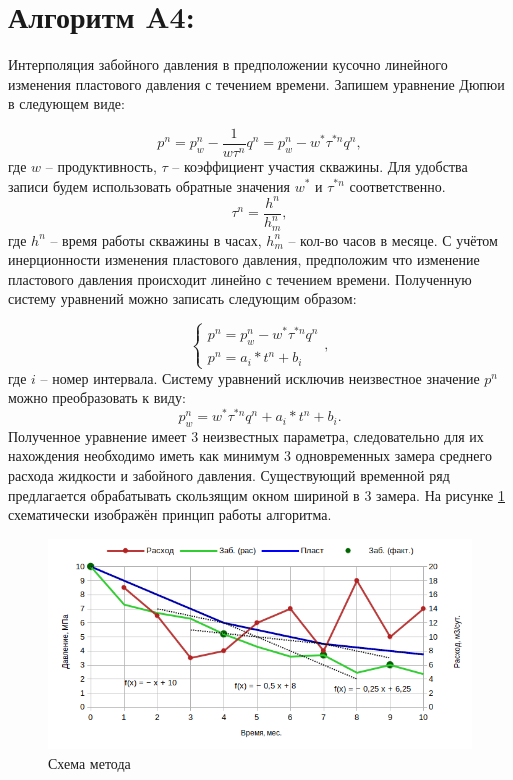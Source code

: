 \documentclass[14pt]{article}
\begin{document}
\section{Алгоритм A4:}
Интерполяция забойного давления в предположении кусочно линейного изменения пластового давления с течением времени. Запишем уравнение Дюпюи в следующем виде:

\begin{equation}
	p^n = p_w^n - \frac{1}{w \tau^n}q^n = p_w^n - w^* \tau^{*n} q^n, 
\end{equation}
где $w$ -- продуктивность, $\tau$ -- коэффициент участия скважины. Для удобства записи будем использовать обратные значения $w^*$ и $\tau^{*n}$ соответственно.
\begin{equation*}
	\tau^n = \frac{h^n}{h^n_m},
\end{equation*}
где $h^n$ -- время работы скважины в часах, $h^n_m$ -- кол-во часов в месяце. 
С учётом инерционности изменения пластового давления, предположим что изменение пластового давления происходит линейно с течением времени. Полученную систему уравнений можно записать следующим образом:

\begin{equation}
	\begin{cases}
		p^n = p_w^n - w^*\tau^{*n}q^n 
		\\
		p^n = a_i*t^n+b_i
	\end{cases},
\end{equation}
где $i$ -- номер интервала. Систему уравнений исключив неизвестное значение $p^n$ можно преобразовать к виду:
 \begin{equation}
 	p_w^n = w^*\tau^{*n}q^n + a_i*t^n+b_i.
 \end{equation}
 Полученное уравнение имеет 3 неизвестных параметра, следовательно для их нахождения необходимо иметь как минимум 3 одновременных замера среднего расхода жидкости и забойного давления. Существующий временной ряд предлагается обрабатывать скользящим окном шириной в 3 замера. На рисунке \ref{fig:schimA4} схематически изображён принцип работы алгоритма.

\begin{figure}[!htb]
	\centering
	\includegraphics[width=1.0\linewidth]{screenshot001}
	\caption{Схема метода}
	\label{fig:schimA4}
\end{figure}
\end{document}
